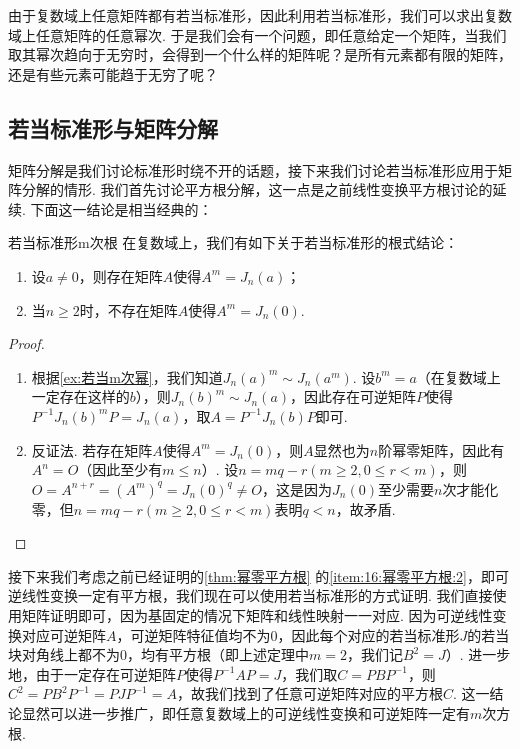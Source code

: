 由于复数域上任意矩阵都有若当标准形，因此利用若当标准形，我们可以求出复数域上任意矩阵的任意幂次. 于是我们会有一个问题，即任意给定一个矩阵，当我们取其幂次趋向于无穷时，会得到一个什么样的矩阵呢？是所有元素都有限的矩阵，还是有些元素可能趋于无穷了呢？

\subsection{若当标准形与矩阵分解}
矩阵分解是我们讨论标准形时绕不开的话题，接下来我们讨论若当标准形应用于矩阵分解的情形. 我们首先讨论平方根分解，这一点是之前线性变换平方根讨论的延续. 下面这一结论是相当经典的：
\begin{theorem}{}{若当标准形m次根}
    在复数域上，我们有如下关于若当标准形的根式结论：
    \begin{enumerate}
        \item 设$a\neq 0$，则存在矩阵$A$使得$A^m=J_n(a)$；
        \item 当$n\geqslant 2$时，不存在矩阵$A$使得$A^m=J_n(0)$.
    \end{enumerate}
\end{theorem}

\begin{proof}
    \begin{enumerate}
        \item 根据\autoref{ex:若当m次幂}，我们知道$J_n(a)^m\sim J_n(a^m)$. 设$b^m=a$（在复数域上一定存在这样的$b$），则$J_n(b)^m\sim J_n(a)$，因此存在可逆矩阵$P$使得$P^{-1}J_n(b)^mP=J_n(a)$，取$A=P^{-1}J_n(b)P$即可.

        \item 反证法. 若存在矩阵$A$使得$A^m=J_n(0)$，则$A$显然也为$n$阶幂零矩阵，因此有$A^n=O$（因此至少有$m\leqslant n$）. 设$n=mq-r(m\geqslant 2,0\leqslant r<m)$，则$O=A^{n+r}=(A^m)^q=J_n(0)^q\neq O$，这是因为$J_n(0)$至少需要$n$次才能化零，但$n=mq-r(m\geqslant 2,0\leqslant r<m)$表明$q<n$，故矛盾.
    \end{enumerate}
\end{proof}

接下来我们考虑之前已经证明的\autoref{thm:幂零平方根} 的\ref*{item:16:幂零平方根:2}，即可逆线性变换一定有平方根，我们现在可以使用若当标准形的方式证明. 我们直接使用矩阵证明即可，因为基固定的情况下矩阵和线性映射一一对应. 因为可逆线性变换对应可逆矩阵$A$，可逆矩阵特征值均不为0，因此每个对应的若当标准形$J$的若当块对角线上都不为0，均有平方根（即上述定理中$m=2$，我们记$B^2=J$）. 进一步地，由于一定存在可逆矩阵$P$使得$P^{-1}AP=J$，我们取$C=PBP^{-1}$，则$C^2=PB^2P^{-1}=PJP^{-1}=A$，故我们找到了任意可逆矩阵对应的平方根$C$. 这一结论显然可以进一步推广，即任意复数域上的可逆线性变换和可逆矩阵一定有$m$次方根.

